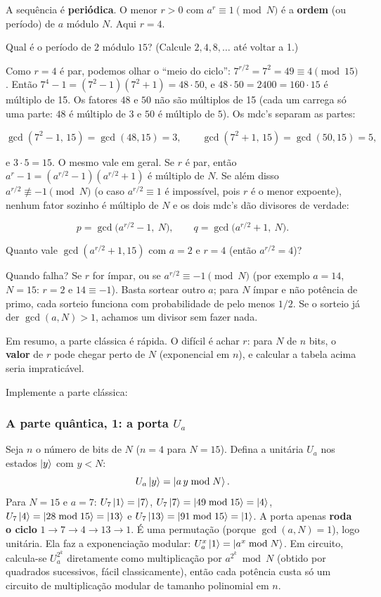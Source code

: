 A sequência é \textbf{periódica}. O menor \(r>0\) com \(a^r\equiv1 \pmod N\) é a \textbf{ordem} (ou período) de \(a\) módulo \(N\). Aqui \(r=4\).

Qual é o período de \(2\) módulo \(15\)? (Calcule \(2,4,8,\dots\) até voltar a 1.)

Como \(r=4\) é par, podemos olhar o ``meio do ciclo'': \(7^{r/2}=7^2=49\equiv4 \pmod{15}\). Então \(7^4-1 = (7^2-1)(7^2+1)=48\cdot50\), e \(48\cdot 50 = 2400 = 160\cdot15\) é múltiplo de 15. Os fatores \(48\) e \(50\) não são múltiplos de 15 (cada um carrega só uma parte: \(48\) é múltiplo de \(3\) e \(50\) é múltiplo de \(5\)). Os mdc's separam as partes:

\[
\gcd(7^2-1,\,15)=\gcd(48,15)=3,\qquad \gcd(7^2+1,\,15)=\gcd(50,15)=5,
\]

e \(3\cdot5=15\). O mesmo vale em geral. Se \(r\) é par, então \(a^r-1=(a^{r/2}-1)(a^{r/2}+1)\) é múltiplo de \(N\). Se além disso \(a^{r/2}\not\equiv-1\pmod N\) (o caso \(a^{r/2}\equiv1\) é impossível, pois \(r\) é o menor expoente), nenhum fator sozinho é múltiplo de \(N\) e os dois mdc's dão divisores de verdade:

\[
p=\gcd\!\big(a^{r/2}-1,\ N\big),\qquad q=\gcd\!\big(a^{r/2}+1,\ N\big).
\]

Quanto vale \(\gcd(a^{r/2}+1,15)\) com \(a=2\) e \(r=4\) (então \(a^{r/2}=4\))?

Quando falha? Se \(r\) for ímpar, ou se \(a^{r/2}\equiv-1 \pmod N\) (por exemplo \(a=14\), \(N=15\): \(r=2\) e \(14\equiv-1\)). Basta sortear outro \(a\); para \(N\) ímpar e não potência de primo, cada sorteio funciona com probabilidade de pelo menos \(1/2\). Se o sorteio já der \(\gcd(a,N)>1\), achamos um divisor sem fazer nada.

Em resumo, a parte clássica é rápida. O difícil é achar \(r\): para \(N\) de \(n\) bits, o \textbf{valor} de \(r\) pode chegar perto de \(N\) (exponencial em \(n\)), e calcular a tabela acima seria impraticável.

Implemente a parte clássica:

\subsubsection{\texorpdfstring{A parte quântica, 1: a porta \(U_a\)}{A parte quântica, 1: a porta U\_a}}\label{a-parte-quuxe2ntica-1-a-porta-u_a}

Seja \(n\) o número de bits de \(N\) (\(n=4\) para \(N=15\)). Defina a unitária \(U_a\) nos estados \(\left|{y}\right>\) com \(y<N\):
\[
U_a\left|{y}\right> = \left|{a\,y \bmod N}\right>.
\]
Para \(N=15\) e \(a=7\): \(U_7\left|{1}\right>=\left|{7}\right>\), \(U_7\left|{7}\right>=\left|{49\bmod15}\right>=\left|{4}\right>\), \(U_7\left|{4}\right>=\left|{28\bmod15}\right>=\left|{13}\right>\) e \(U_7\left|{13}\right>=\left|{91\bmod15}\right>=\left|{1}\right>\). A porta apenas \textbf{roda o ciclo} \(1\to7\to4\to13\to1\). É uma permutação (porque \(\gcd(a,N)=1\)), logo unitária. Ela faz a exponenciação modular: \(U_a^{x}\left|{1}\right>=\left|{a^x\bmod N}\right>\). Em circuito, calcula-se \(U_a^{2^k}\) diretamente como multiplicação por \(a^{2^k}\bmod N\) (obtido por quadrados sucessivos, fácil classicamente), então cada potência custa só um circuito de multiplicação modular de tamanho polinomial em \(n\).

